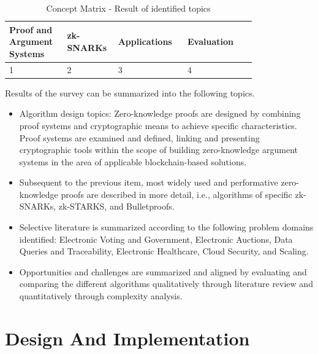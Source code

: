 \setlength{\tabcolsep}{2ex}
\renewcommand{\arraystretch}{1.5}%
\begin{table}[ht]
	\centering
	    \caption{Concept Matrix - Result of identified topics}
		\begin{tabular}{| m{0.2\linewidth} | m{0.1\linewidth} | m{0.25\linewidth} |m{0.25\linewidth} |}\hline
		\textbf{Proof and Argument Systems} & \textbf{zk-SNARKs} & \textbf{Applications} & \textbf{Evaluation}\\ \hline
            1 & 2 & 3 & 4 \\ \hline
	\end{tabular}
\label{tab:concept_matrix}
\end{table}

Results of the survey can be summarized into the following topics. 
\begin{itemize}
    \item Algorithm design topics: Zero-knowledge proofs are designed by combining proof systems and cryptographic means to achieve specific characteristics. Proof systems are examined and defined, linking and presenting cryptographic tools within the scope of building zero-knowledge argument systems in the area of applicable blockchain-based solutions.
    \item Subsequent to the previous item, most widely used and performative zero-knowledge proofs are described in more detail, i.e., algorithms of specific zk-SNARKs, zk-STARKS, and Bulletproofs.
    \item Selective literature is summarized according to the following problem domains identified: Electronic Voting and Government, Electronic Auctions, Data Queries and Traceability, Electronic Healthcare, Cloud Security, and Scaling.
    \item Opportunities and challenges are summarized and aligned by evaluating and comparing the different algorithms qualitatively through literature review and quantitatively through complexity analysis.
\end{itemize}

\section{Design And Implementation}

